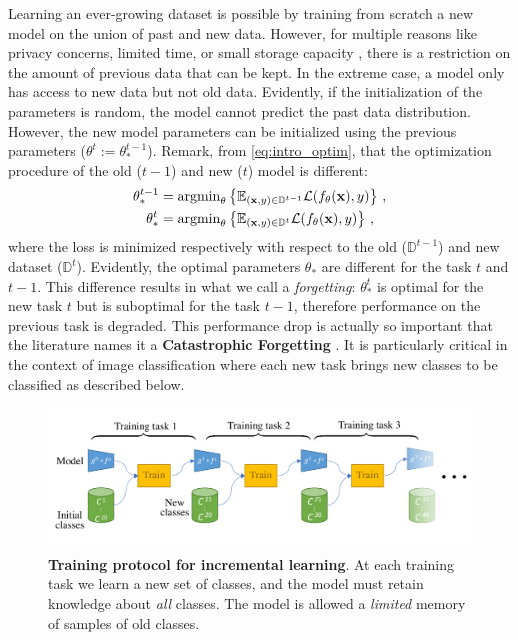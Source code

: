 Learning an ever-growing dataset is possible by training from scratch a new model on the union of
past and new data. However, for multiple reasons like privacy concerns, limited time, or small
storage capacity \citep{vasquez2017incrementalneuralforest}, there is a restriction on the amount of
previous data that can be kept. In the extreme case, a model only has access to new data but not old
data. Evidently, if the initialization of the parameters is random, the model cannot predict
the past data distribution. However, the new model parameters can be initialized using the
previous parameters ($\theta^{t} := \theta_*^{t-1}$). Remark, from \autoref{eq:intro_optim}, that
the optimization procedure of the old ($t-1$) and new ($t$) model is different:
%
\begin{equation}
      \begin{aligned}
            \theta_*^{t-1} & = \operatorname{argmin}_{\theta} \left \{ \mathbb{E}_{(\mathbf{x},y)\in \mathbb{D}^{t-1}} \mathcal{L}(f_\theta(\mathbf{x}), y)\right \}\,, \\
            \theta_*^{t}   & = \operatorname{argmin}_{\theta} \left \{ \mathbb{E}_{(\mathbf{x},y)\in \mathbb{D}^{t}} \mathcal{L}(f_\theta(\mathbf{x}), y)\right \}\,,
      \end{aligned}
      \label{eq:intro_forgetting_weights}
\end{equation}
%
where the loss is minimized respectively with respect to the old ($\mathbb{D}^{t-1}$) and new
dataset ($\mathbb{D}^{t}$). Evidently, the optimal parameters $\theta_*$ are different for the task
$t$ and $t-1$. This difference results in what we call a \textit{forgetting}: $\theta_*^t$ is
optimal for the new task $t$ but is suboptimal for the task $t-1$, therefore performance on the
previous task is degraded. This performance drop is actually so important that the literature names
it a \textbf{Catastrophic Forgetting} \citep{robins1995catastrophicforgetting}. It is particularly
critical in the context of image classification where each new task brings new classes to be
classified as described below.

\begin{figure}[tb]
      \begin{center}
            \includegraphics[width=1.0\linewidth]{images/related/protocol}
      \end{center}
      \caption{\textbf{Training protocol for incremental learning}. At each training task we learn a
            new set of classes, and the model must retain knowledge about \textit{all} classes. The
            model is allowed a \textit{limited} memory of samples of old classes.}
      \label{fig:related_protocol}
\end{figure}

